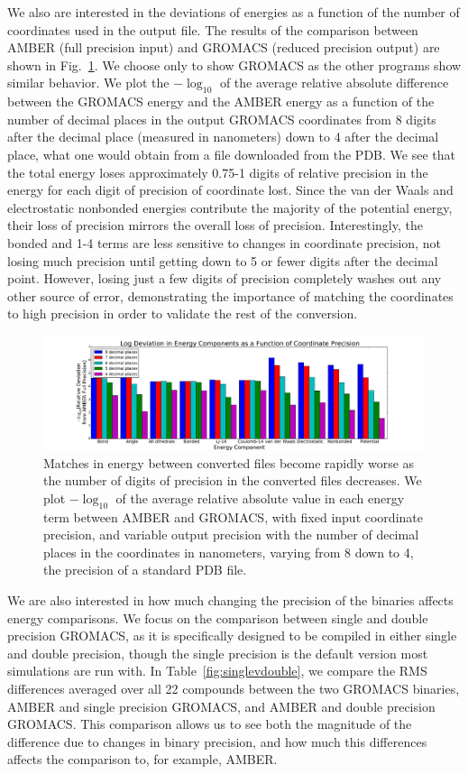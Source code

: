 We also are interested in the deviations of energies as a function of
the number of coordinates used in the output file. The results of the
comparison between AMBER (full precision input) and GROMACS (reduced
precision output) are shown in Fig.~\ref{fig:precision}.  We choose
only to show GROMACS as the other programs show similar behavior. We
plot the $-\log_{10}$ of the average relative absolute difference
between the GROMACS energy and the AMBER energy as a function of the
number of decimal places in the output GROMACS coordinates from 8
digits after the decimal place (measured in nanometers) down to 4
after the decimal place, what one would obtain from a file downloaded
from the PDB.  We see that the total energy loses approximately 0.75-1
digits of relative precision in the energy for each digit of precision
of coordinate lost. Since the van der Waals and electrostatic
nonbonded energies contribute the majority of the potential energy,
their loss of precision mirrors the overall loss of
precision. Interestingly, the bonded and 1-4 terms are less sensitive
to changes in coordinate precision, not losing much precision until
getting down to 5 or fewer digits after the decimal point.  However,
losing just a few digits of precision completely washes out any other
source of error, demonstrating the importance of matching the
coordinates to high precision in order to validate the rest of the
conversion.

\begin{figure}[h]
\includegraphics[width=\textwidth]{precisioncomparison.pdf}   
\caption{Matches in energy between converted files become rapidly
  worse as the number of digits of precision in the converted files
  decreases. We plot $-\log_{10}$ of the average relative absolute
  value in each energy term between AMBER and GROMACS, with fixed
  input coordinate precision, and variable output precision with the
  number of decimal places in the coordinates in nanometers, varying
  from 8 down to 4, the precision of a standard PDB file.
\label{fig:precision}}
\end{figure}

We are also interested in how much changing the precision of the
binaries affects energy comparisons.  We focus on the comparison
between single and double precision GROMACS, as it is specifically
designed to be compiled in either single and double precision, though
the single precision is the default version most simulations are run
with. In Table~\ref{fig:singlevdouble}, we compare the RMS differences
averaged over all 22 compounds between the two GROMACS binaries, AMBER
and single precision GROMACS, and AMBER and double precision GROMACS.
This comparison allows us to see both the magnitude of the difference
due to changes in binary precision, and how much this differences
affects the comparison to, for example, AMBER.

